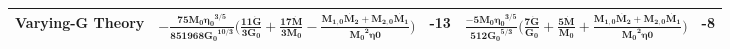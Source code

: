 \documentclass[11pt]{article}
\begin{document}
\begin{tabular}{ |p{1cm}|p{6.9cm}|p{0.4cm}|p{6cm}|p{0.3cm}|}
 \hline
 \vspace{20pt}
 \tiny Varying-G Theory&\rule{0pt}{4ex}\tiny $\bm{-\frac{75 M_0 {\eta_0}^{3/5}}{851968 {G_0}^{10/3}} \bigg(\frac{11 \dot{G}}{3 G_0} + \frac{17 \dot{M}}{3M_0}-\frac{M_{1,0}\dot{M_2}+M_{2,0}\dot{M_1}}{{M_0}^2 \eta0}\bigg)}$&\tiny-13&\tiny$\bm{\frac{-5 M_0 {\eta_0}^{3/5}}{512 {G_0}^{5/3}} \bigg(\frac{7 \dot{G}}{ G_0} + \frac{5\dot{M}}{M_0}+\frac{M_{1,0}\dot{M_2}+M_{2,0}\dot{M_1}}{{M_0}^2 \eta0}\bigg)}$&\tiny-8\\
\hline
\end{tabular}




\end{document}
